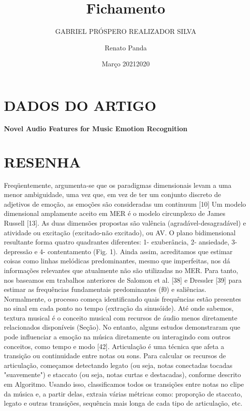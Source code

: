 \documentclass{article}
\title{Fichamento}
\author{GABRIEL PRÓSPERO REALIZADOR  SILVA}
\date{Março 2021}
\begin{document}
\maketitle

\section{DADOS DO ARTIGO}
\textbf{Novel Audio Features for Music Emotion Recognition \\}
\author{Renato Panda \\}
\date{2020}

\section{RESENHA}
Freqüentemente, argumenta-se que os paradigmas dimensionais levam a uma menor ambiguidade, uma vez que, em vez de ter um conjunto discreto de adjetivos de emoção, as emoções são consideradas um continuum [10] Um modelo dimensional amplamente aceito em MER é o modelo circunplexo de James Russell [13].
As duas dimensões propostas são valência (agradável-desagradável) e atividade ou excitação (excitado-não excitado), ou AV. O plano bidimensional resultante forma quatro quadrantes diferentes: 1- exuberância, 2- ansiedade, 3- depressão e 4- contentamento (Fig. 1).
Ainda assim, acreditamos que estimar coisas como linhas melódicas predominantes, mesmo que imperfeitas, nos dá informações relevantes que atualmente não são utilizadas no MER. Para tanto, nos baseamos em trabalhos anteriores de Salomon et al. [38] e Dressler [39] para estimar as frequências fundamentais predominantes (f0) e saliências. Normalmente, o processo começa identificando quais frequências estão presentes no sinal em cada ponto no tempo (extração da sinusóide).
Até onde sabemos, textura musical é o conceito musical com recursos de áudio menos diretamente relacionados disponíveis (Seção). No entanto, alguns estudos demonstraram que pode influenciar a emoção na música diretamente ou interagindo com outros conceitos, como tempo e modo [42]. 
Articulação é uma técnica que afeta a transição ou continuidade entre notas ou sons. Para calcular os recursos de articulação, começamos detectando legato (ou seja, notas conectadas tocadas "suavemente") e staccato (ou seja, notas curtas e destacadas), conforme descrito em Algoritmo. Usando isso, classificamos todos os
transições entre notas no clipe da música e, a partir delas, extraia várias métricas como: proporção de staccato, legato e outras transições, sequência mais longa de cada tipo de articulação, etc.
\end{document}
